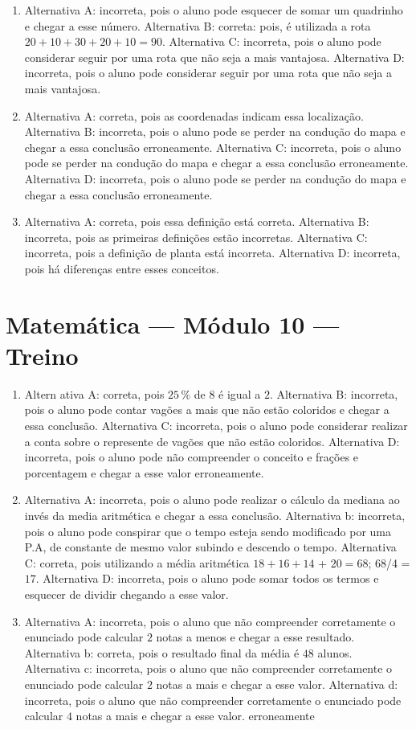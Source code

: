 \begin{enumerate}
\item Alternativa A: incorreta, pois o aluno pode esquecer de somar um
quadrinho e chegar a esse número.
Alternativa B: correta: pois, é utilizada a rota $20 + 10 + 30 + 20 + 10 = 90$.
Alternativa C: incorreta, pois o aluno pode considerar seguir por uma
rota que não seja a mais vantajosa.
Alternativa D: incorreta, pois o aluno pode considerar seguir por uma
rota que não seja a mais vantajosa.
\item Alternativa A: correta, pois as coordenadas indicam essa localização.
Alternativa B: incorreta, pois o aluno pode se perder na condução do
mapa e chegar a essa conclusão erroneamente.
Alternativa C: incorreta, pois o aluno pode se perder na condução do
mapa e chegar a essa conclusão erroneamente.
Alternativa D: incorreta, pois o aluno pode se perder na condução do
mapa e chegar a essa conclusão erroneamente.
\item Alternativa A: correta, pois essa definição está correta.
Alternativa B: incorreta, pois as primeiras definições estão incorretas.
Alternativa C: incorreta, pois a definição de planta está incorreta.
Alternativa D: incorreta, pois há diferenças entre esses conceitos.
\end{enumerate}

\section*{Matemática — Módulo 10 — Treino}

\begin{enumerate}
\item Altern ativa A: correta, pois $25\,\%$ de $8$ é igual a $2$.
Alternativa B: incorreta, pois o aluno pode contar vagões a mais que não
estão coloridos e chegar a essa conclusão.
Alternativa C: incorreta, pois o aluno pode considerar realizar a conta
sobre o represente de vagões que não estão coloridos.
Alternativa D: incorreta, pois o aluno pode não compreender o conceito e
frações e porcentagem e chegar a esse valor erroneamente.
\item Alternativa A: incorreta, pois o aluno pode realizar o cálculo da
mediana ao invés da media aritmética e chegar a essa conclusão.
Alternativa b: incorreta, pois o aluno pode conspirar que o tempo esteja
sendo modificado por uma P.A, de constante de mesmo valor subindo e
descendo o tempo.
Alternativa C: correta, pois utilizando a média aritmética $18 + 16 + 14$
+ $20 = 68$; 68/4 = $17$.
Alternativa D: incorreta, pois o aluno pode somar todos os termos e
esquecer de dividir chegando a esse valor.
\item Alternativa A: incorreta, pois o aluno que não compreender corretamente
o enunciado pode calcular $2$ notas a menos e chegar a esse resultado.
Alternativa b: correta, pois o resultado final da média é $48$ alunos.
Alternativa c: incorreta, pois o aluno que não compreender corretamente
o enunciado pode calcular $2$ notas a mais e chegar a esse valor.
Alternativa d: incorreta, pois o aluno que não compreender corretamente
o enunciado pode calcular $4$ notas a mais e chegar a esse valor.
erroneamente
\end{enumerate}

